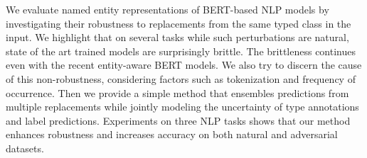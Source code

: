 We evaluate named entity representations of BERT-based NLP models by investigating their robustness to replacements from the same typed class in the input. We highlight that on several tasks while such perturbations are natural, state of the art trained models are surprisingly brittle. The brittleness continues even with the recent entity-aware BERT models. We also try to discern the cause of this non-robustness, considering factors such as tokenization and frequency of occurrence. Then we provide a simple method that ensembles predictions from multiple replacements while jointly modeling the uncertainty of type annotations and label predictions. Experiments on three NLP tasks shows that our method enhances robustness and increases accuracy on both natural and adversarial datasets.
